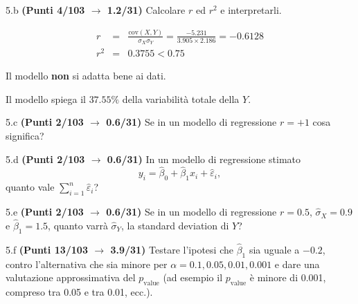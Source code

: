 \documentclass[
  11pt,
]{book}
\theoremstyle{mytheoremstyle}
\theoremstyle{mydefstyle}
\newenvironment{sol}
  {
  \begin{tcolorbox}[enhanced,breakable,arc=0.1mm,boxrule=1pt,colback=white,colframe=iblue,
  title=\bf \fontfamily{lmss}\selectfont \hspace{.5 cm} Soluzione,drop fuzzy shadow]

}{
\end{tcolorbox}
  }
\begin{document}
5.b \textbf{(Punti 4/103 \(\rightarrow\) 1.2/31)} Calcolare \(r\) ed \(r^2\) e interpretarli.

\begin{sol}
\begin{eqnarray*}
r&=&\frac{\text{cov}(X,Y)}{\sigma_X\sigma_Y}=\frac{ -5.231 }{ 3.905 \times 2.186 }= -0.6128 \\ 
r^2&=& 0.3755 < 0.75
\end{eqnarray*}

Il modello \textbf{non} si adatta bene ai dati.

Il modello spiega il \(37.55\%\) della variabilità totale della \(Y\).

\end{sol}

5.c \textbf{(Punti 2/103 \(\rightarrow\) 0.6/31)} Se in un modello di regressione \(r=+1\) cosa significa?

5.d \textbf{(Punti 2/103 \(\rightarrow\) 0.6/31)} In un modello di regressione stimato
\[
 y_i =  \hat\beta_0 + \hat\beta_1 x_i + \hat\varepsilon_i,
\]
quanto vale \(\sum_{i=1}^n\hat\varepsilon_i\)?

5.e \textbf{(Punti 2/103 \(\rightarrow\) 0.6/31)} Se in un modello di regressione \(r=0.5\), \(\hat\sigma_X=0.9\) e \(\hat\beta_1=1.5\), quanto varrà \(\hat\sigma_Y\), la standard deviation di \(Y\)?

5.f \textbf{(Punti 13/103 \(\rightarrow\) 3.9/31)} Testare l'ipotesi che \(\hat\beta_1\) sia uguale a \(-0.2\), contro l'alternativa che sia minore per \(\alpha=0.1,0.05,0.01,0.001\) e dare una valutazione approssimativa del \(p_\text{value}\) (ad esempio il \(p_\text{value}\) è minore di 0.001, compreso tra 0.05 e tra 0.01, ecc.).
\end{document}
